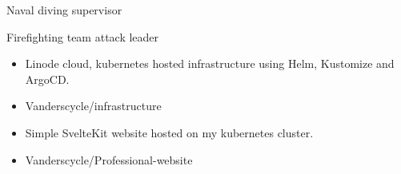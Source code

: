 \documentclass[10pt,a4paper,ragged2e,withhyper]{altacv}
\begin{document}
\begin{paracol}{2}
\cvachievements{\faCertificate}
Naval diving supervisor

\cvachievements{\faCertificate}
Firefighting team attack leader


\begin{itemize}
\item Linode cloud, kubernetes hosted infrastructure using Helm, Kustomize and
  ArgoCD.
\item \faGithub Vanderscycle/infrastructure
\end{itemize}

\begin{itemize}
\item Simple SvelteKit website hosted on my kubernetes cluster.
\item \faGithub Vanderscycle/Professional-website
\end{itemize}
\end{paracol}
\end{document}
